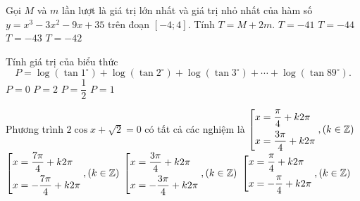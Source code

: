 \begin{ex}%
	Gọi $M$ và $m$ lần lượt là giá trị lớn nhất và giá trị nhỏ nhất của hàm số $y=x^3-3x^2-9x+35$ trên đoạn $\left[ -4;4\right]$. Tính $T=M+2m$.
	\choice
	{$T=-41$}
	{$T=-44$}
	{$T=-43$}
	{\True $T=-42$}
\end{ex}

\begin{ex}%
Tính giá trị của biểu thức $$P=\log{\left( \tan {1}^\circ\right)}+\log{\left( \tan {2}^\circ\right)}+\log{\left( \tan {3}^\circ\right)}+\cdots + \log{\left( \tan {89}^\circ\right)}.$$
\choice
{\True $P=0$}
{$P=2$}
{$P=\dfrac{1}{2}$}
{$P=1$}
\end{ex}

\begin{ex}%
Phương trình $2\cos x +\sqrt{2}=0$ có tất cả các nghiệm là
\choice
{$\left[\begin{aligned}
&x=\dfrac{\pi}{4}+k2\pi \\ &x=\dfrac{3\pi}{4}+k2\pi\end{aligned}\right.,\left( k\in \mathbb{Z}\right)$}
{$\left[\begin{aligned}
&x=\dfrac{7\pi}{4}+k2\pi \\ &x=-\dfrac{7\pi}{4}+k2\pi\end{aligned}\right.,\left( k\in \mathbb{Z}\right)$}
{\True $\left[\begin{aligned}
&x=\dfrac{3\pi}{4}+k2\pi \\ &x=-\dfrac{3\pi}{4}+k2\pi\end{aligned}\right.,\left( k\in \mathbb{Z}\right)$}
{$\left[\begin{aligned}
&x=\dfrac{\pi}{4}+k2\pi \\ &x=-\dfrac{\pi}{4}+k2\pi\end{aligned}\right.,\left( k\in \mathbb{Z}\right)$}
\end{ex}

